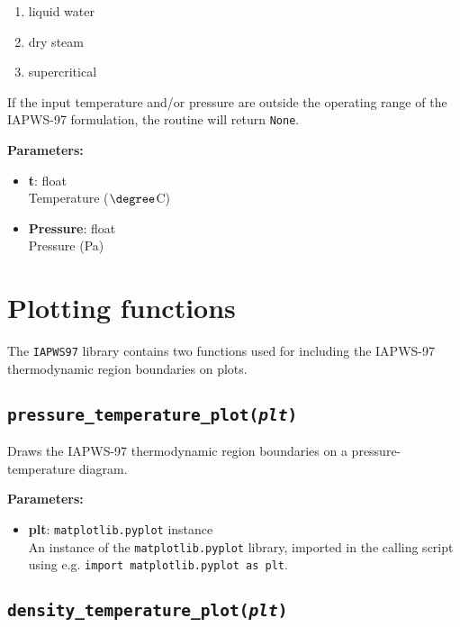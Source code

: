 \begin{enumerate}
  \item liquid water
  \item dry steam
  \item supercritical
\end{enumerate}

If the input temperature and/or pressure are outside the operating range of the IAPWS-97 formulation, the routine will return \texttt{None}.

\textbf{Parameters:}
\begin{itemize}
\item \textbf{t}: float\\
  Temperature ($\degree$C)
\item \textbf{Pressure}: float\\
  Pressure (Pa)
\end{itemize}

\section{Plotting functions}

The \texttt{IAPWS97} library contains two functions used for including the IAPWS-97 thermodynamic region boundaries on plots.

\begin{snugshade}
\subsection{\texttt{pressure\_temperature\_plot(\emph{plt})}}
\end{snugshade}
\label{sec:iapws97:pressure_temperature_plot}

Draws the IAPWS-97 thermodynamic region boundaries on a pressure-temperature diagram.

\textbf{Parameters:}
\begin{itemize}
\item \textbf{plt}: \texttt{matplotlib.pyplot} instance\\
  An instance of the \texttt{matplotlib.pyplot} library, imported in the calling script using e.g. \texttt{import matplotlib.pyplot as plt}.
\end{itemize}

\begin{snugshade}
\subsection{\texttt{density\_temperature\_plot(\emph{plt})}}
\end{snugshade}
\label{sec:iapws97:density_temperature_plot}

